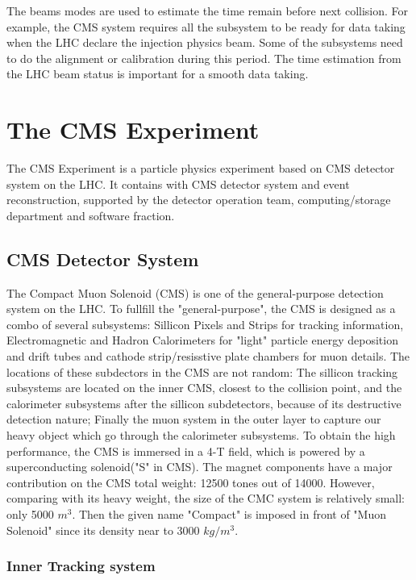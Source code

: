 The beams modes are used to estimate the time remain before next collision. For example, the CMS system requires all the subsystem to be ready for data taking when the LHC declare the injection physics beam. Some of the subsystems need to do the alignment or calibration during this period. The time estimation from the LHC beam status is important for a smooth data taking.

\section{The CMS Experiment}

The CMS Experiment is a particle physics experiment based on CMS detector system on the LHC. It contains with CMS detector system and event reconstruction, supported by the detector operation team, computing/storage department and software fraction.

\subsection{CMS Detector System}

The Compact Muon Solenoid (CMS) is one of the general-purpose detection system on the LHC. To fullfill the "general-purpose", the CMS is designed as a combo of several subsystems: Sillicon Pixels and Strips for tracking information, Electromagnetic and Hadron Calorimeters for "light" particle energy deposition and drift tubes and cathode strip/resisstive plate chambers for muon details. The locations of these subdectors in the CMS are not random: The sillicon tracking subsystems are located on the inner CMS, closest to the collision point, and the calorimeter subsystems after the sillicon subdetectors, because of its destructive detection nature; Finally the muon system in the outer layer to capture our heavy object which go through the calorimeter subsystems. To obtain the high performance, the CMS is immersed in a 4-T field, which is powered by a superconducting solenoid("S" in CMS). The magnet components have a major contribution on the CMS total weight: 12500 tones out of 14000. However, comparing with its heavy weight, the size of the CMC system is relatively small: only 5000 $m^{3}$. Then the given name "Compact" is imposed in front of "Muon Solenoid" since its density near to 3000 $kg/m^{3}$.

\subsubsection{Inner Tracking system}


